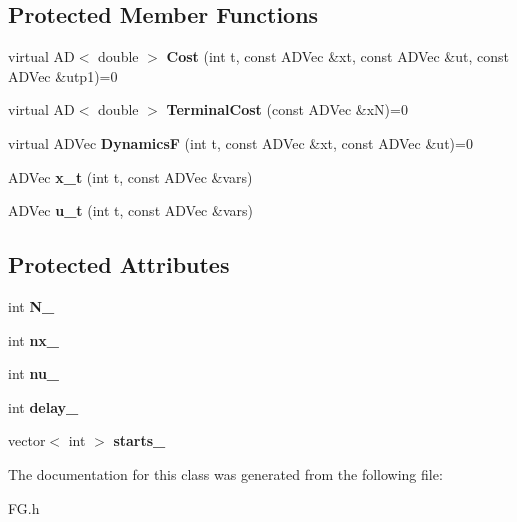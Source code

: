 \subsection*{Protected Member Functions}
\begin{DoxyCompactItemize}
\item 
\mbox{\label{classFG_a6a20571aec42684c2df0e87f4db9f3bc}} 
virtual AD$<$ double $>$ {\bfseries Cost} (int t, const A\+D\+Vec \&xt, const A\+D\+Vec \&ut, const A\+D\+Vec \&utp1)=0
\item 
\mbox{\label{classFG_a43f264c2d88bdba1c6dab55c7084fa10}} 
virtual AD$<$ double $>$ {\bfseries Terminal\+Cost} (const A\+D\+Vec \&xN)=0
\item 
\mbox{\label{classFG_a64302c3b6760ba5766d1329bcc379774}} 
virtual A\+D\+Vec {\bfseries DynamicsF} (int t, const A\+D\+Vec \&xt, const A\+D\+Vec \&ut)=0
\item 
\mbox{\label{classFG_a81a190dbddd269a9966f93ce5b3cec63}} 
A\+D\+Vec {\bfseries x\+\_\+t} (int t, const A\+D\+Vec \&vars)
\item 
\mbox{\label{classFG_a37a2f4d5d3f962c2678fd23b3ce12abf}} 
A\+D\+Vec {\bfseries u\+\_\+t} (int t, const A\+D\+Vec \&vars)
\end{DoxyCompactItemize}
\subsection*{Protected Attributes}
\begin{DoxyCompactItemize}
\item 
\mbox{\label{classFG_a3c4bc838fa09a7e8179b0dffca6732ef}} 
int {\bfseries N\+\_\+}
\item 
\mbox{\label{classFG_a2c8b36a9a94b7f90b1623ac391513706}} 
int {\bfseries nx\+\_\+}
\item 
\mbox{\label{classFG_ad5dcb50ed54c8b1563d3697d48a75b62}} 
int {\bfseries nu\+\_\+}
\item 
\mbox{\label{classFG_a8b139f7c9038515156eadfeaa101e7c8}} 
int {\bfseries delay\+\_\+}
\item 
\mbox{\label{classFG_a35e77e2569c397974b2178ef4cfb0cd7}} 
vector$<$ int $>$ {\bfseries starts\+\_\+}
\end{DoxyCompactItemize}


The documentation for this class was generated from the following file\+:\begin{DoxyCompactItemize}
\item 
F\+G.\+h\end{DoxyCompactItemize}

